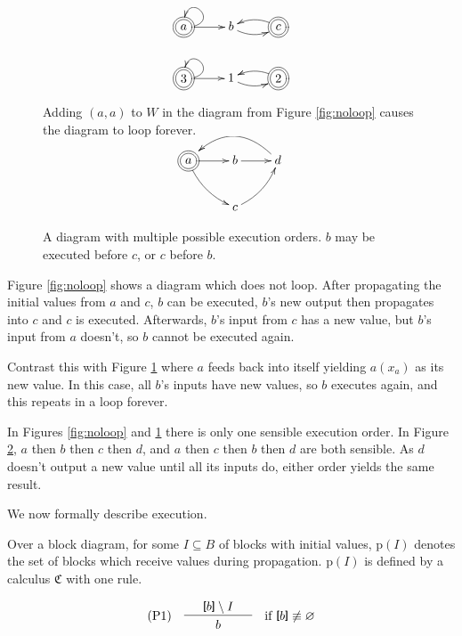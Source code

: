 \documentclass[twocolumn]{article}
\newcommand{\TightBracketB}[1]{\raisebox{0.25ex}{\scalebox{0.8}{\boldmath${#1\kern-0.65ex#1}$}}}%
\newcommand*{\Inputs}[1]{\TightBracketB[#1\TightBracketB]}
\begin{document}
\begin{figure}[h]
\[
\xymatrix{
    *++[o][F=]{a} \ar[r] \ar@(r, u)[] & b \ar@/_/[r] & *++[o][F=]{c} \ar@/_/[l] \\
    *++[o][F=]{3} \ar[r] \ar@(r, u)[] & 1 \ar@/_/[r] & *++[o][F=]{2} \ar@/_/[l] \\
}
\]
    \caption{Adding $(a, a)$ to $W$ in the diagram from Figure \ref{fig:noloop} causes the diagram to loop forever.}
    \label{fig:noloop2loop}
\end{figure}

\begin{figure}[h]
\vspace{1em}
\[
\xymatrix{
    *++[o][F=]{a} \ar[r]\ar@/_/[dr] & b \ar[r] & d \ar@/_2em/[ll] \\
    & c \ar@/_/[ur]
}
\]
    \caption{A diagram with multiple possible execution orders. $b$ may be executed before $c$, or $c$ before $b$.}
    \label{fig:multi-order}
\end{figure}

Figure \ref{fig:noloop} shows a diagram which does not loop. After propagating the initial values from $a$ and $c$, $b$ can be executed, $b$'s new output then propagates into $c$ and $c$ is executed. Afterwards, $b$'s input from $c$ has a new value, but $b$'s input from $a$ doesn't, so $b$ cannot be executed again.

Contrast this with Figure \ref{fig:noloop2loop} where $a$ feeds back into itself yielding $a(x_a)$ as its new value. In this case, all $b$'s inputs have new values, so $b$ executes again, and this repeats in a loop forever.

In Figures \ref{fig:noloop} and \ref{fig:noloop2loop} there is only one sensible execution order. In Figure \ref{fig:multi-order}, $a$ then $b$ then $c$ then $d$, and $a$ then $c$ then $b$ then $d$ are both sensible. As $d$ doesn't output a new value until all its inputs do, either order yields the same result.

We now formally describe execution.

Over a block diagram, for some $I\subseteq B$ of blocks with initial values, $\text{p}(I)$ denotes the set of blocks which receive values during propagation. $\text{p}(I)$ is defined by a calculus $\mathfrak{C}$ with one rule.

\[
    \text{(P1)}\quad\begin{array}{l c l}
    & \Inputs{b} \setminus I & \\
    \hline\\[-1em]
    & b &
    \end{array} \quad\text{if } \Inputs{b}\not\equiv\varnothing
\]
\end{document}
